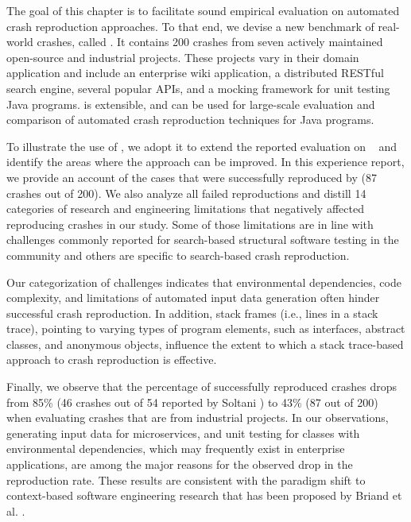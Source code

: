 The goal of this chapter is to facilitate sound empirical evaluation on automated crash reproduction approaches.
To that end, we devise a new benchmark of real-world crashes, called \crashpack.
It contains 200 crashes from seven actively maintained open-source and industrial projects.
These projects vary in their domain application and include an enterprise wiki application, a distributed RESTful search engine, several popular APIs, and a mocking framework for unit testing Java programs. 
\crashpack is extensible, and can be used for large-scale evaluation and comparison of automated crash reproduction techniques for Java programs.

To illustrate the use of \crashpack, we adopt it to extend the reported evaluation on \evocrash~\cite{soltani2017} and identify the areas where the approach can be improved.
In this experience report, we provide an account of the cases that were successfully reproduced by \evocrash (87 crashes out of 200). 
We also analyze all failed reproductions and distill 14 categories of research and engineering limitations that negatively affected reproducing crashes in our study. 
Some of those limitations are in line with challenges commonly reported for search-based structural software testing in the community \cite{xiao2011precise, McMinn2011, Fraser2014b} and others are specific to search-based crash reproduction.

Our categorization of challenges indicates that environmental dependencies, code complexity, and limitations of automated input data generation often hinder successful crash reproduction.
In addition, stack frames (i.e., lines in a stack trace), pointing to varying types of program elements, such as interfaces, abstract classes, and anonymous objects, influence the extent to which a stack trace-based approach to crash reproduction is effective.

Finally, we observe that the percentage of successfully reproduced crashes drops from 85\% (46 crashes out of 54 reported by Soltani \etal \cite{Soltani2018a}) to 43\% (87 out of 200) when evaluating crashes that are from industrial projects. 
In our observations, generating input data for microservices, and unit testing for classes with environmental dependencies, which may frequently exist in enterprise applications, are among the major reasons for the observed drop in the reproduction rate.
These results are consistent with the paradigm shift to context-based software engineering research that has been proposed by Briand et al. \cite{Briand2017a}.

